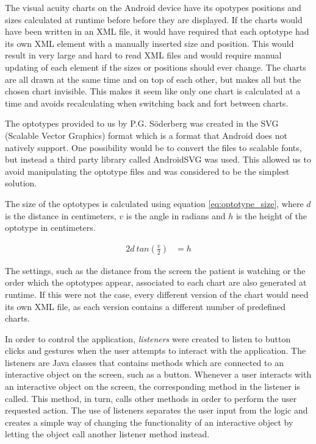 \documentclass[12pt,a4paper,notitlepage]{report}
\begin{document}
The visual acuity charts on the Android device have its opotypes positions and sizes calculated at runtime before before they are displayed. If the charts would have been written in an XML file, it would have required that each optotype had its own XML element with a manually inserted size and position. This would result in very large and hard to read XML files and would require manual updating of each element if the sizes or positions should ever change. The charts are all drawn at the same time and on top of each other, but makes all but the chosen chart invisible. This makes it seem like only one chart is calculated at a time and avoids recalculating when switching back and fort between charts.

The optotypes provided to us by P.G. Söderberg was created in the SVG (Scalable Vector Graphics) format which is a format that Android does not natively support. One possibility would be to convert the files to scalable fonts, but instead a third party library called AndroidSVG \cite{AndroidSVG} was used. This allowed us to avoid manipulating the optotype files and was considered to be the simplest solution.


The size of the optotypes is calculated using equation \ref{eq:optotype_size}, where $d$ is the distance in centimeters, $v$ is the angle in radians and $h$ is the height of the optotype in centimeters.

\begin{equation}
	\begin{split}
  		2d\ tan(\frac{v}{2}) & = h
  	\end{split}
  	\label{eq:optotype_size}
\end{equation}

The settings, such as the distance from the screen the patient is watching or the order which the optotypes appear, associated to each chart are also generated at runtime. If this were not the case, every different version of the chart would need its own XML file, as each version contains a different number of predefined charts.

In order to control the application, \textit{listeners} were created to listen to button clicks and gestures when the user attempts to interact with the application. The listeners are Java classes that contains methods which are connected to an interactive object on the screen, such as a button. Whenever a user interacts with an interactive object on the screen, the corresponding method in the listener is called. This method, in turn, calls other methods in order to perform the user requested action. The use of listeners separates the user input from the logic and creates a simple way of changing the functionality of an interactive object by letting the object call another listener method instead.
\end{document}

